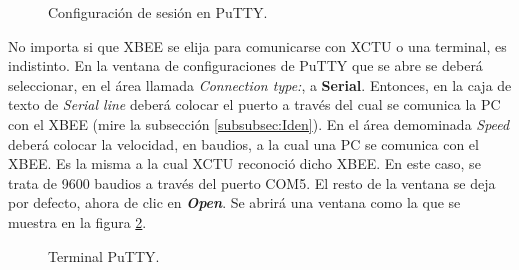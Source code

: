 \begin{figure}[H] %
\caption{Configuración de sesión en PuTTY.}
\label{fig:Pu}
\end{figure}

No importa si que XBEE se elija para comunicarse con XCTU o una terminal, es indistinto. En la ventana de configuraciones de PuTTY que se abre se deberá seleccionar, en el área llamada \textit{Connection type:}, a \textbf{Serial}. Entonces, en la caja de texto de \textit{Serial line} deberá colocar el puerto a través del cual se comunica la PC con el XBEE (mire la subsección \ref{subsubsec:Iden}). En el área demominada \textit{Speed} deberá colocar la velocidad, en baudios, a la cual una PC se comunica con el XBEE. Es la misma a la cual XCTU reconoció dicho XBEE. En este caso, se trata de 9600 baudios a través del puerto COM5. El resto de la ventana se deja por defecto, ahora de clic en \textit{\textbf{Open}}. Se abrirá una ventana como la que se muestra en la figura \ref{fig:PuttCon}.

\begin{figure}[H] %
\caption{Terminal PuTTY.}
\label{fig:PuttCon}
\end{figure}

